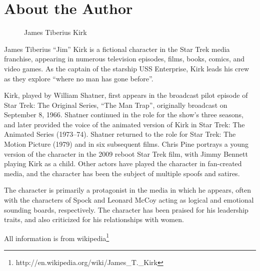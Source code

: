 \chapter{About the Author}

\begin{figure}[h]
  \centering
  \caption{James Tiberius Kirk}
\end{figure}

James Tiberius ``Jim'' Kirk is a fictional character in the Star Trek media franchise, appearing in numerous television episodes, films, books, comics, and video games. As the captain of the starship USS Enterprise, Kirk leads his crew as they explore ``where no man has gone before''.

Kirk, played by William Shatner, first appears in the broadcast pilot episode of Star Trek: The Original Series, ``The Man Trap'', originally broadcast on September 8, 1966. Shatner continued in the role for the show's three seasons, and later provided the voice of the animated version of Kirk in Star Trek: The Animated Series (1973–74). Shatner returned to the role for Star Trek: The Motion Picture (1979) and in six subsequent films. Chris Pine portrays a young version of the character in the 2009 reboot Star Trek film, with Jimmy Bennett playing Kirk as a child. Other actors have played the character in fan-created media, and the character has been the subject of multiple spoofs and satires.

The character is primarily a protagonist in the media in which he appears, often with the characters of Spock and Leonard McCoy acting as logical and emotional sounding boards, respectively. The character has been praised for his leadership traits, and also criticized for his relationships with women.

All information is from wikipedia\footnote{http://en.wikipedia.org/wiki/James\_T.\_Kirk}